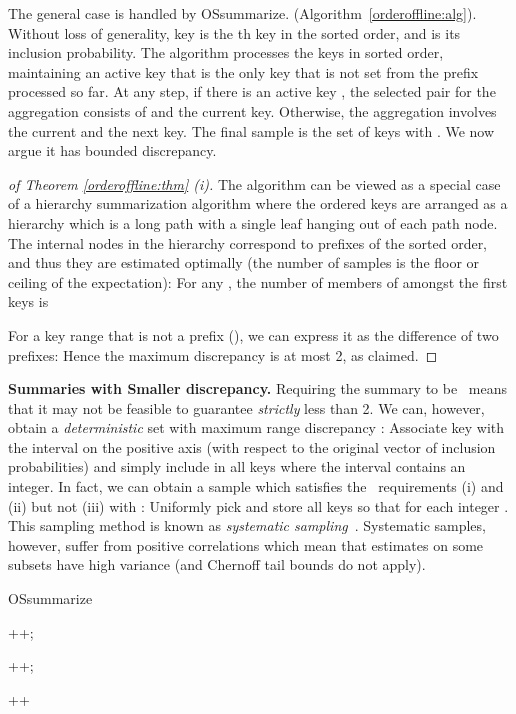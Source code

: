 \documentclass[11pt]{article}
\begin{document}
The general case is handled by
{\sc OSsummarize}.
(Algorithm~\ref{orderoffline:alg}). 
Without loss of generality, key  is the th key in the sorted
order, and  is its inclusion probability.
The algorithm processes the keys in sorted order, maintaining 
an active key  that is the only key that is not set 
from the prefix processed so far.
 At any step, if there is an active key , the selected pair for the
 aggregation consists of  and the current key.  
Otherwise, the aggregation involves the current and the next key.
The final sample  is the set of keys with  .  
We now argue it has bounded discrepancy.

\begin{proof}[of Theorem \ref{orderoffline:thm} (i)]
The algorithm can be viewed as a special case of a hierarchy summarization
algorithm where the ordered keys are arranged as a  
hierarchy which is a long path with a single leaf hanging out of each
path node.   
The internal nodes in the hierarchy correspond to prefixes of the
sorted order, and thus they are estimated optimally
(the number of samples is the floor or ceiling of the expectation):
For any , 
the number of members of  amongst the first  keys is
 
For a key range  that is not a prefix (),
we can express it as the difference of two prefixes:
{\small
}
\noindent
Hence the maximum discrepancy is at most 2, as claimed. 
\end{proof}

\noindent
{\bf Summaries with Smaller discrepancy.}
  Requiring the summary to be \varopt\ means that it may not be
feasible to guarantee  {\em strictly} less than 2. 
We can, however, obtain a {\em deterministic} set with maximum range 
discrepancy :
 Associate key  with the
interval  on the positive axis (with respect to the original vector of inclusion probabilities) and simply 
include in  all keys where the  interval contains an integer.
In fact, we can obtain a sample which satisfies the
\varopt\ requirements (i) and (ii) but not (iii) with :
Uniformly pick 
and store all keys  so that  for each integer .
 This sampling method is known as {\em systematic sampling}~\cite{SSW92}. 
Systematic samples, however, suffer from positive correlations which mean
that estimates on some subsets have high variance (and Chernoff tail
bounds do not apply). 

\label{negorderoffline}

\begin{algorithm}[t]
\caption{{\sc OSsummarize}}\label{orderoffline:alg}
\begin{algorithmic}[1]
\State  {}
\State  {}

\While {} 
    \State  ++;
  \EndWhile

  \Statex
  \State 
    \State ++;
  \EndWhile

  \Statex

     
      \State  {}
    \EndIf
    \State ++
  \EndIf 
\EndWhile
\end{algorithmic}
\end{algorithm}
\end{document}

